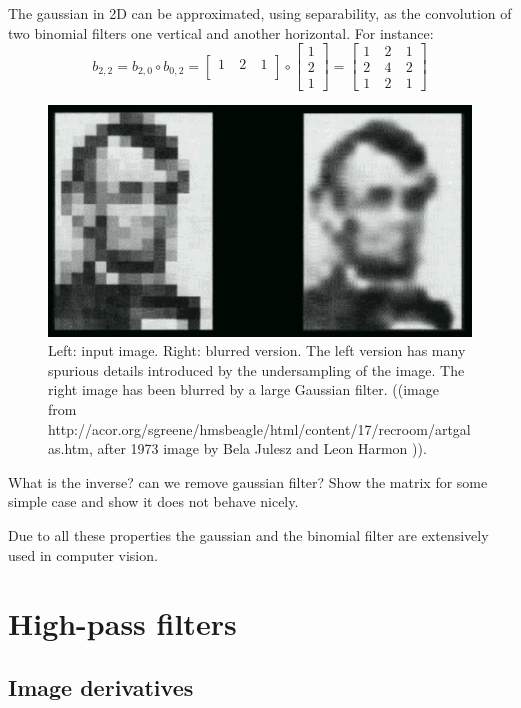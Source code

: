 The gaussian in 2D can be approximated, using separability, as the convolution of two binomial filters one vertical and another horizontal. For instance:
\begin{equation}
	b_{2,2} = b_{2,0} \circ b_{0,2} =  \begin{bmatrix}
		1 ~ & 2 ~ & 1 \\
	\end{bmatrix}\circ \begin{bmatrix}
		1 \\
		2 \\
		1
	\end{bmatrix}=
	\begin{bmatrix}
		1 ~ & 2 ~ & 1 \\
		2 ~ & 4 ~ & 2 \\
		1~  & 2 ~ & 1
	\end{bmatrix}
\end{equation}


\begin{figure}
	\centerline{
		\includegraphics[width=0.55\linewidth]{figures/spatial_filters/lincoln.pdf}}
	\caption{Left:  input image.  Right:  blurred version.  The left
		version has many spurious details introduced by the undersampling of
		the image.  The right image has been blurred by a large Gaussian
		filter.  ((image from
		http://acor.org/sgreene/hmsbeagle/html/content/17/recroom/artgalas.htm,
		after 1973 image by Bela Julesz and Leon Harmon )).
	}
	\label{fig:lincoln}
\end{figure}


What is the inverse? can we remove gaussian filter? Show the matrix for some simple case and show it does not behave nicely.

Due to all these properties the gaussian and the binomial filter are extensively used in computer vision.


\section{High-pass filters}


\subsection{Image derivatives}

